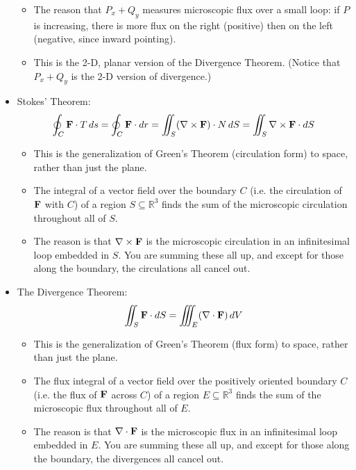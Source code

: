 \begin{itemize}
\begin{itemize}
        \item The reason that \(P_x + Q_y\) measures microscopic flux over a small loop: if \(P\) is increasing, there is more flux on the right (positive) then on the left (negative, since inward pointing).
        \item This is the 2-D, planar version of the Divergence Theorem. (Notice that \(P_x + Q_y\) is the 2-D version of divergence.)
    \end{itemize}
    \item Stokes’ Theorem:
    \[
        \oint_C \mathbf{F} \cdot T \, ds = \oint_C \mathbf{F} \cdot dr = \iint_S (\nabla \times \mathbf{F}) \cdot N \, dS = \iint_S \nabla \times \mathbf{F} \cdot dS
    \]
    \begin{itemize}
        \item This is the generalization of Green’s Theorem (circulation form) to space, rather than just the plane.
        \item The integral of a vector field over the boundary \(C\) (i.e. the circulation of \(\mathbf{F}\) with \(C\)) of a region \(S \subseteq \mathbb{R}^3\) finds the sum of the microscopic circulation throughout all of \(S\).
        \item The reason is that \(\nabla \times \mathbf{F}\) is the microscopic circulation in an infinitesimal loop embedded in \(S\). You are summing these all up, and except for those along the boundary, the circulations all cancel out.
    \end{itemize}
    \item The Divergence Theorem:
    \[
        \iint_S \mathbf{F} \cdot dS = \iiint_E (\nabla \cdot \mathbf{F}) \, dV
    \]
    \begin{itemize}
        \item This is the generalization of Green’s Theorem (flux form) to space, rather than just the plane.
        \item The flux integral of a vector field over the positively oriented boundary \(C\) (i.e. the flux of \(\mathbf{F}\) across \(C\)) of a region \(E \subseteq \mathbb{R}^3\) finds the sum of the microscopic flux throughout all of \(E\).
        \item The reason is that \(\nabla \cdot \mathbf{F}\) is the microscopic flux in an infinitesimal loop embedded in \(E\). You are summing these all up, and except for those along the boundary, the divergences all cancel out.
    \end{itemize}
\end{itemize}

